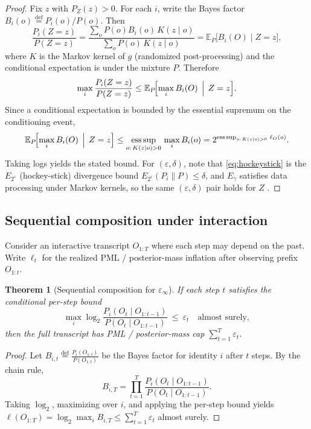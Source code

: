 \documentclass[11pt]{article}
\newcommand{\EE}{\mathbb{E}}
\newcommand{\defeq}{\stackrel{\mathrm{def}}{=}}
\newtheorem{theorem}{Theorem}
\theoremstyle{definition}
\theoremstyle{remark}
\begin{document}
\begin{proof}
Fix $z$ with $P_Z(z)>0$. For each $i$, write the Bayes factor $B_i(o)\defeq P_i(o)/P(o)$.
Then
\[
\frac{P_i(Z=z)}{P(Z=z)}=\frac{\sum_o P(o)B_i(o)\,K(z\mid o)}{\sum_o P(o)\,K(z\mid o)}=\EE_P\!\bigl[B_i(O)\mid Z=z\bigr],
\]
where $K$ is the Markov kernel of $g$ (randomized post-processing) and the conditional expectation is under the mixture $P$.
Therefore
\[
\max_i \frac{P_i(Z=z)}{P(Z=z)} \le \EE_P\!\Bigl[\max_i B_i(O)\,\Bigm|\, Z=z\Bigr].
\]
Since a conditional expectation is bounded by the essential supremum on the conditioning event,
\[
\EE_P\!\Bigl[\max_i B_i(O)\,\Bigm|\, Z=z\Bigr]
\le \operatorname*{ess\,sup}_{o:\,K(z\mid o)>0}\,\max_i B_i(o)
=2^{\operatorname*{ess\,sup}_{o:\,K(z\mid o)>0}\,\ell_O(o)}.
\]
Taking logs yields the stated bound.
For $(\varepsilon,\delta)$, note that \eqref{eq:hockeystick} is the $E_{2^\varepsilon}$ (hockey-stick) divergence bound $E_{2^\varepsilon}(P_i\|P)\le\delta$, and $E_\gamma$ satisfies data processing under Markov kernels, so the same $(\varepsilon,\delta)$ pair holds for $Z$ \cite{LiuCuffVerdu2017}.
\end{proof}

\subsection{Sequential composition under interaction}
Consider an interactive transcript $O_{1:T}$ where each step may depend on the past.
Write $\ell_t$ for the realized PML / posterior-mass inflation after observing prefix $O_{1:t}$.

\begin{theorem}[Sequential composition for $\varepsilon_\infty$]\label{thm:epsinf_comp}
If each step $t$ satisfies the conditional per-step bound
\[
\max_i \log_2\frac{P_i(O_t\mid O_{1:t-1})}{P(O_t\mid O_{1:t-1})}\ \le\ \varepsilon_t
\quad \text{almost surely},
\]
then the full transcript has PML / posterior-mass cap $\sum_{t=1}^T \varepsilon_t$.
\end{theorem}

\begin{proof}
Let $B_{i,t}\defeq \frac{P_i(O_{1:t})}{P(O_{1:t})}$ be the Bayes factor for identity $i$ after $t$ steps.
By the chain rule,
\[
B_{i,T}=\prod_{t=1}^T \frac{P_i(O_t\mid O_{1:t-1})}{P(O_t\mid O_{1:t-1})}.
\]
Taking $\log_2$, maximizing over $i$, and applying the per-step bound yields
$\ell(O_{1:T})=\log_2\max_i B_{i,T}\le \sum_{t=1}^T \varepsilon_t$ almost surely.
\end{proof}
\end{document}

